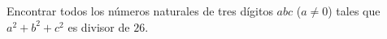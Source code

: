 Encontrar todos los números naturales de tres dígitos $abc$ ($a\ne0$) tales que $a^2+b^2+c^2$ es divisor de $26$.

